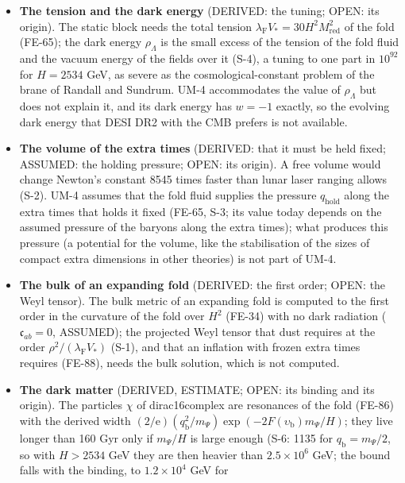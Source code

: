 \documentclass[
  10pt,
]{article}
\providecommand{\tightlist}{%
  \setlength{\itemsep}{0pt}\setlength{\parskip}{0pt}}
\begin{document}
\begin{itemize}
\tightlist
\item
  \textbf{The tension and the dark energy} (DERIVED: the tuning; OPEN:
  its origin). The static block needs the total tension
  \(\lambda_{\mathrm{F}}V_* = 30H^2M_{\mathrm{red}}^2\) of the fold
  (FE-65); the dark energy \(\rho_\Lambda\) is the small excess of the
  tension of the fold fluid and the vacuum energy of the fields over it
  (S-4), a tuning to one part in \(10^{92}\) for \(H = 2534\) GeV, as
  severe as the cosmological-constant problem of the brane of Randall
  and Sundrum. UM-4 accommodates the value of \(\rho_\Lambda\) but does
  not explain it, and its dark energy has \(w = -1\) exactly, so the
  evolving dark energy that DESI DR2 with the CMB prefers is not
  available.
\item
  \textbf{The volume of the extra times} (DERIVED: that it must be held
  fixed; ASSUMED: the holding pressure; OPEN: its origin). A free volume
  would change Newton's constant 8545 times faster than lunar laser
  ranging allows (S-2). UM-4 assumes that the fold fluid supplies the
  pressure \(q_{\mathrm{hold}}\) along the extra times that holds it
  fixed (FE-65, S-3; its value today depends on the assumed pressure of
  the baryons along the extra times); what produces this pressure (a
  potential for the volume, like the stabilisation of the sizes of
  compact extra dimensions in other theories) is not part of UM-4.
\item
  \textbf{The bulk of an expanding fold} (DERIVED: the first order;
  OPEN: the Weyl tensor). The bulk metric of an expanding fold is
  computed to the first order in the curvature of the fold over \(H^2\)
  (FE-34) with no dark radiation (\(\mathfrak{c}_{ab} = 0\), ASSUMED);
  the projected Weyl tensor that dust requires at the order
  \(\rho^2/(\lambda_{\mathrm{F}}V_*)\) (S-1), and that an inflation with
  frozen extra times requires (FE-88), needs the bulk solution, which is
  not computed.
\item
  \textbf{The dark matter} (DERIVED, ESTIMATE; OPEN: its binding and its
  origin). The particles \(\chi\) of dirac16complex are resonances of
  the fold (FE-86) with the derived width
  \((2/\mathrm{e})(q_{\mathrm{b}}^2/m_\Psi)\exp(-2F(\upsilon_{\mathrm{b}})m_\Psi/H)\);
  they live longer than 160 Gyr only if \(m_\Psi/H\) is large enough
  (S-6: 1135 for \(q_{\mathrm{b}} = m_\Psi/2\), so with \(H > 2534\) GeV
  they are then heavier than \(2.5\times10^6\) GeV; the bound falls with
  the binding, to \(1.2\times10^4\) GeV for

\end{itemize}
\end{document}
